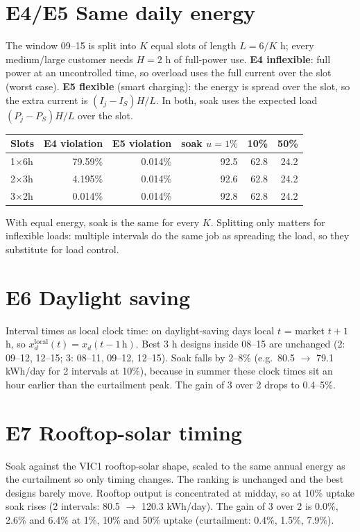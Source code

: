 \documentclass[10.5pt,a4paper]{article}
\begin{document}
\section{E4/E5 Same daily energy}
The window 09--15 is split into \(K\) equal slots of length \(L=6/K\) h; every medium/large
customer needs \(H=2\) h of full-power use. \textbf{E4 inflexible}: full power at an uncontrolled
time, so overload uses the full current over the slot (worst case). \textbf{E5 flexible} (smart
charging): the energy is spread over the slot, so the extra current is \((I_j-I_S)H/L\). In both,
soak uses the expected load \((P_j-P_S)H/L\) over the slot.
\begin{center}\small
\begin{tabular}{lrrrrr}
\toprule
Slots & E4 violation & E5 violation & soak \(u=1\%\) & 10\% & 50\%\\
\midrule
1\(\times\)6h & 79.59\% & 0.014\% & 92.5 & 62.8 & 24.2\\
2\(\times\)3h & 4.195\% & 0.014\% & 92.6 & 62.8 & 24.2\\
3\(\times\)2h & 0.014\% & 0.014\% & 92.8 & 62.8 & 24.2\\
\bottomrule
\end{tabular}
\end{center}
With equal energy, soak is the same for every \(K\). Splitting only matters for inflexible
loads: multiple intervals do the same job as spreading the load, so they substitute for load control.

\section{E6 Daylight saving}
Interval times as local clock time: on daylight-saving days local \(t\) = market \(t+1\) h, so
\(x^{\text{local}}_d(t)=x_d(t-1\,\text{h})\). Best 3 h designs inside 08--15 are unchanged
(2: 09--12, 12--15; 3: 08--11, 09--12, 12--15). Soak falls by 2--8\% (e.g.\ 80.5 \(\to\) 79.1 kWh/day for
2 intervals at 10\%), because in summer these clock times sit an hour earlier than the
curtailment peak. The gain of 3 over 2 drops to 0.4--5\%.

\section{E7 Rooftop-solar timing}
Soak against the VIC1 rooftop-solar shape, scaled to the same annual energy as the curtailment so only timing
changes. The ranking is unchanged and the best designs barely move. Rooftop output is
concentrated at midday, so at 10\% uptake soak rises (2 intervals: 80.5 \(\to\) 120.3 kWh/day).
The gain of 3 over 2 is 0.0\%, 2.6\% and 6.4\% at 1\%, 10\% and 50\% uptake (curtailment: 0.4\%, 1.5\%, 7.9\%).
\end{document}
